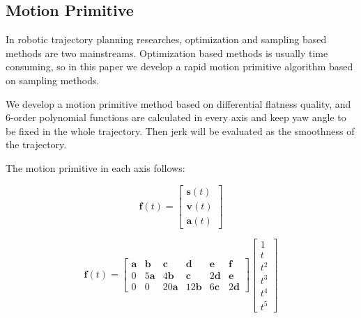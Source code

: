 \documentclass{jarticle}
\begin{document}
  




\subsection{Motion Primitive}
In robotic trajectory planning researches, optimization and sampling based methods are two mainstreams. Optimization based methods is usually time consuming, so in this paper we develop a rapid motion primitive algorithm based on sampling methods.

We develop a motion primitive method based on differential flatness quality, and 6-order polynomial functions are calculated in every axis and keep yaw angle to be fixed in the whole trajectory. Then jerk will be evaluated as the smoothness of the trajectory\cite{eth-juggling}.

The motion primitive in each axis follows:

\begin{equation}
  \label{eq:temp}
  \bm{f}(t) = \left[ \begin{array}{c}
      \bm{s}(t) \\
      \bm{v}(t) \\
      \bm{a}(t)
    \end{array}\right]
\end{equation}

\begin{equation}
  \label{eq:temp2}
  \bm{f}(t) = \begin{bmatrix}
      \bm{a} & \bm{b} & \bm{c} & \bm{d} & \bm{e} & \bm{f} \\
      0 & 5\bm{a} & 4\bm{b} & \bm{c} & 2\bm{d} & \bm{e} \\
      0 & 0 & 20\bm{a} & 12\bm{b} & 6\bm{c} & 2\bm{d}
  \end{bmatrix}
  \left[ \begin{array}{c}
      1 \\
      t \\
      t^2 \\
      t^3 \\
      t^4 \\
      t^5
    \end{array}\right]
\end{equation}
\end{document}
